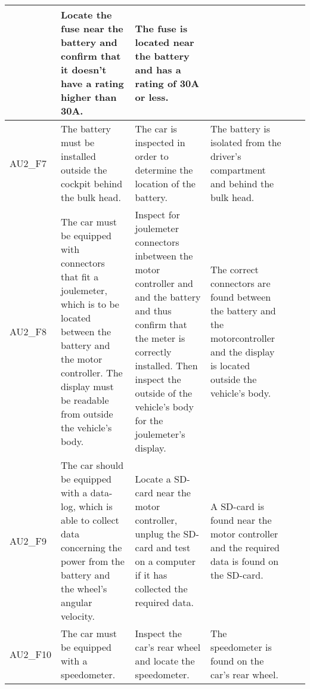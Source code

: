 \begin{longtable}{|p{1.6 cm}|p{2.9 cm}|p{2.9 cm}|p{1.9 cm}|p{1.8 cm}|p{1.8 cm}|}
	& Locate the fuse near the battery and confirm that it doesn't have a rating higher than 30A. 
	& The fuse is located near the battery and has a rating of 30A or less. 
	& 
	& \\ \hline
	AU2\_F7 
	& The battery must be installed outside the cockpit behind the bulk head.
	& The car is inspected in order to determine the location of the battery.
	& The battery is isolated from the driver's compartment and behind the bulk head. 
	& 
	& \\ \hline
	AU2\_F8 
	& The car must be equipped with connectors that fit a joulemeter, which is to be located between the battery and the motor controller. The display must be readable from outside the vehicle's body.
	& Inspect for joulemeter connectors inbetween the motor controller and and the battery and thus confirm that the meter is correctly installed. Then inspect the outside of the vehicle's body for the joulemeter's display.
	& The correct connectors are found between the battery and the motorcontroller and the display is located outside the vehicle's body.
	& 
	& \\ \hline
	AU2\_F9 
	& The car should be equipped with a data-log, which is able to collect data concerning the power from the battery and the wheel's angular velocity.
	& Locate a SD-card near the motor controller, unplug the SD-card and test on a computer if it has collected the required data.  
	& A SD-card is found near the motor controller and the required data is found on the SD-card.
	& 
	& \\ \hline
	AU2\_F10 
	& The car must be equipped with a speedometer.
	& Inspect the car's rear wheel and locate the speedometer.
	& The speedometer is found on the car's rear wheel. 
	& 
	& \\ \hline				
\end{longtable}

